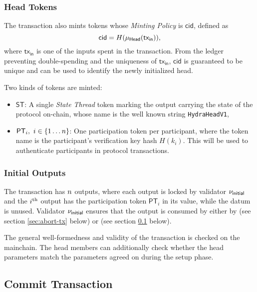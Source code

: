 \subsubsection{Head Tokens}

The \mtxInit{} transaction also mints tokens whose \emph{Minting Policy} is $\mathsf{cid}$, defined as 
$$
\mathsf{cid} = H(\mu_\mathsf{Head}(\mathsf{tx_{in}})),
$$
where $\mathsf{tx_{in}}$ is one of the inputs spent in the \mtxInit{} transaction. From the ledger preventing double-spending and the uniqueness of $\mathsf{tx_{in}}$, $\mathsf{cid}$ is guaranteed to be unique and can be used to identify the newly initialized head. 

Two kinds of tokens are minted:
\begin{itemize}
\item $\mathsf{ST}$: A single \emph{State Thread} token marking the output carrying the state of the protocol on-chain, whose name is the well known string \texttt{HydraHeadV1},
\item $\mathsf{PT}_i,\ i\in \{1 \dots n \}$: One participation token per participant, where the token name is the participant's verification key hash $H(k_i)$. This will be used to authenticate participants in protocol transactions.
\end{itemize}

\subsubsection{Initial Outputs}

The \mtxInit{} transaction has $n$ outputs, where each output is
locked by validator $\nu_\mathsf{initial}$ and the $i^{\text{th}}$ output has the participation
token $\mathsf{PT}_i$ in its value, while the datum is unused. Validator $\nu_\mathsf{initial}$
ensures that the output is consumed by either by \mtxAbort{} (see section \ref{sec:abort-tx} below) or \mtxCom{} (see section \ref{sec:commit-tx} below).

The general well-formedness and validity of the \mtxInit{} transaction is
checked on the mainchain. The head members can additionally check whether the head
parameters match the parameters agreed on during the setup phase.

\subsection{Commit Transaction}\label{sec:commit-tx}



